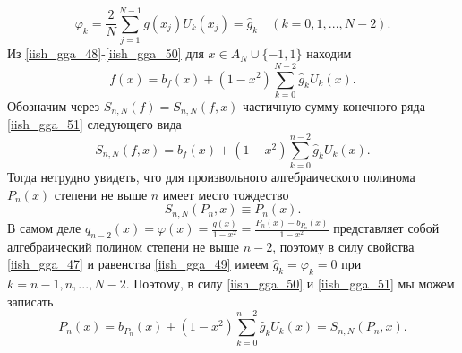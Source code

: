 \begin{equation}
  \varphi_k = \frac2N\sum\limits_{j=1}^{N-1}g(x_j)U_k(x_j)=\hat{g}_k \quad (k=0,1,...,N-2). \label{iish_gga_50}
\end{equation}
Из \eqref{iish_gga_48}-\eqref{iish_gga_50} для $x\in A_N \cup \{-1, 1\}$ находим
\begin{equation}
  f(x)=b_f(x)+(1-x^2)\sum\limits_{k=0}^{N-2}\hat{g}_k U_k(x). \label{iish_gga_51}
\end{equation}
Обозначим через $S_{n,N}(f)=S_{n,N}(f,x)$ частичную сумму конечного ряда \eqref{iish_gga_51} следующего вида
\begin{equation}
  S_{n,N}(f,x) = b_f(x) + (1-x^2)\sum\limits_{k=0}^{n-2}\hat{g}_k U_k(x). \label{iish_gga_52}
\end{equation}
Тогда нетрудно увидеть, что для произвольного алгебраического полинома $P_n(x)$ степени не выше $n$ имеет место
тождество
\begin{equation}
  S_{n,N}(P_n, x) \equiv P_n(x). \label{iish_gga_53}
\end{equation}
В самом деле $q_{n-2}(x) = \varphi(x) = \frac{g(x)}{1-x^2} = \frac{P_n(x)-b_{P_n}(x)}{1-x^2}$ представляет собой
алгебраический полином степени не выше $n-2$, поэтому в силу свойства \eqref{iish_gga_47} и равенства \eqref{iish_gga_49}
имеем $\hat{g}_k = \varphi_k = 0$ при $k=n-1, n, ...,N-2$. Поэтому, в силу \eqref{iish_gga_50} и \eqref{iish_gga_51} мы
можем записать
\begin{equation*}
  P_n(x) = b_{P_n}(x)+(1-x^2)\sum\limits_{k=0}^{n-2}\hat{g}_k U_k(x)=S_{n,N}(P_n,x).
\end{equation*}

